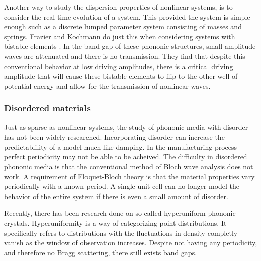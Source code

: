 \documentclass{article}
\begin{document}
Another way to study the dispersion properties of nonlinear systems, is to 
consider the real time evolution of a system. This provided the system is 
simple enough such as a discrete lumped parameter system consisting of masses 
and springs. Frazier and Kochmann do just this when considering systems with 
bistable elements \cite{frazier16}. In the band gap of these phononic 
structures, small 
amplitude waves are attenuated and there is no transmission. They find that 
despite this conventional behavior at low driving amplitudes, there is a 
critical driving amplitude that will cause these bistable elements to flip to 
the other well of potential energy and allow for the transmission of nonlinear 
waves.


\subsubsection{Disordered materials}
Just as sparse as nonlinear systems, the study of phononic media with disorder 
has not been widely researched. Incorporating disorder can increase the 
predictablility of a model much like damping. In the manufacturing process 
perfect periodicity may not be able to be acheived. The difficulty in 
disordered phononic media is that the conventional method of Bloch wave 
analysis does not work. A requirement of Floquet-Bloch theory is that the 
material properties vary periodically with a known period. A single unit cell 
can no longer model the behavior of the entire system if there is even a small 
amount of disorder.

Recently, there has been research done on so called hyperuniform phononic 
crystals. Hyperuniformity is a way of categorizing point distributions. It 
specifically refers to distributions with the fluctuations in density completly 
vanish as the window of observation increases. Despite not having any 
periodicity, and therefore no Bragg scattering, there still exists band gaps.
\end{document}

